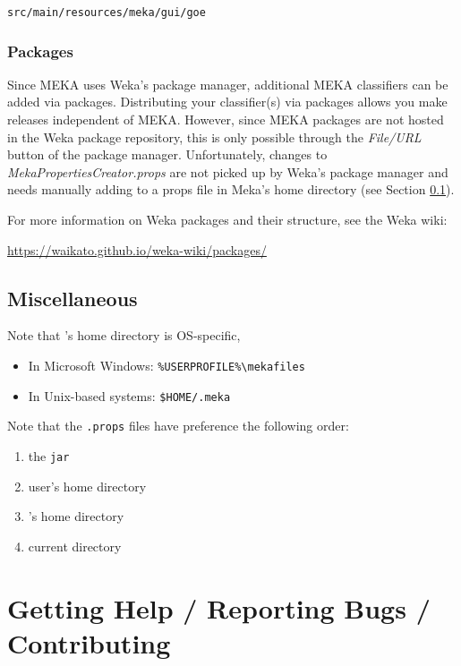 \documentclass[11pt]{article}
\newcommand{\MEKA}{Meka}
\begin{document}
\begin{verbatim}
src/main/resources/meka/gui/goe
\end{verbatim}


\subsubsection{Packages}
\label{packages}
Since MEKA uses Weka's package manager, additional MEKA classifiers can be
added via packages. Distributing your classifier(s) via packages allows you make
releases independent of MEKA.
However, since MEKA packages are not hosted in the Weka package repository, this
is only possible through the \textit{File/URL} button of the package manager.
Unfortunately, changes to \textit{MekaPropertiesCreator.props} are not picked up
by Weka's package manager and needs manually adding to a props file in Meka's
home directory (see Section \ref{misc}).

\noindent For more information on Weka packages and their structure, see the Weka wiki:

\url{https://waikato.github.io/weka-wiki/packages/}{}


\subsection{Miscellaneous}
\label{misc}
Note that \framework{\MEKA}'s home directory is OS-specific,

\begin{itemize}
	\item In Microsoft Windows: \texttt{\%USERPROFILE\%\textbackslash mekafiles}
	\item In Unix-based systems: \texttt{\$HOME/.meka}
\end{itemize}

\noindent Note that the \texttt{.props} files have preference the following order:
\begin{enumerate}
	\item the \texttt{jar}
	\item user's home directory
	\item \framework{\MEKA}'s home directory
	\item current directory
\end{enumerate}

\section{Getting Help / Reporting Bugs / Contributing}
\end{document}

